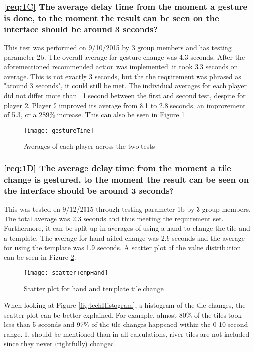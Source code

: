 	\subsubsection*{\ref{req:1C} The average delay time from the moment a gesture is done, to the moment the result can be seen on the interface should be around 3 seconds?}
	This test was performed on 9/10/2015 by 3 group members and has testing parameter 2b. The overall average for gesture change was 4.3 seconds. After the aforementioned recommended action was implemented, it took 3.3 seconds on average. This is not exactly 3 seconds, but the the requirement was phrased as "around 3 seconds", it could still be met. The individual averages for each player did not differ more than ~1 second between the first and second test, despite for player 2. Player 2 improved its average from 8.1 to 2.8 seconds, an improvement of 5.3, or a 289\% increase. This can also be seen in Figure \ref{fig:techGestureTime}
	
\begin{figure}[h!]
	\centering
	\texttt{[image: gestureTime]}
	\caption{Averages of each player across the two tests} 
	\label{fig:techGestureTime}
\end{figure}

	\subsubsection*{\ref{req:1D} The average delay time from the moment a tile change is gestured, to the moment the result can be seen on the interface should be around 3 seconds?}
	This was tested on 9/12/2015 through testing parameter 1b by 3 group members. The total average was 2.3 seconds and thus meeting the requirement set. Furthermore, it can be split up in averages of using a hand to change the tile and a template. The average for hand-aided change was 2.9 seconds and the average for using the template was 1.9 seconds. A scatter plot of the value distribution can be seen in Figure \ref{fig:techScatter1}.
	
\begin{figure}[h!]
	\centering
	\texttt{[image: scatterTempHand]}
	\caption{Scatter plot for hand and template tile change} 
	\label{fig:techScatter1}
\end{figure}

When looking at Figure \ref{fig:techHistogram}, a histogram of the tile changes, the scatter plot can be better explained. For example, almost 80\% of the tiles took less than 5 seconds and 97\% of the tile changes happened within the 0-10 second range. It should be mentioned than in all calculations, river tiles are not included since they never (rightfully) changed. 

